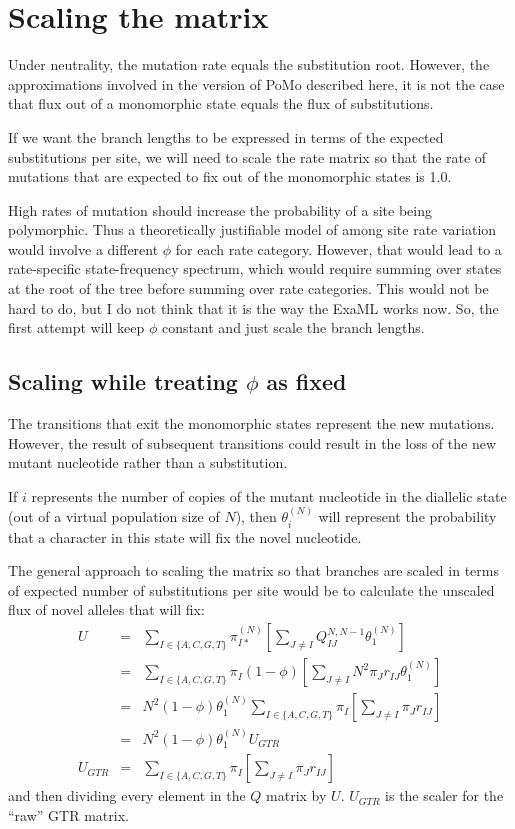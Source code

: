 \documentclass{llncs}
\newcommand{\polyProb}{\ensuremath{\phi}}
\newcommand{\pomo}{PoMo\xspace}
\begin{document}
\section{Scaling the matrix}
Under neutrality, the mutation rate equals the substitution root.
However, the approximations involved in the version of \pomo described here, 
    it is not the case that flux out of a monomorphic state equals the flux
    of substitutions.

If we want the branch lengths to be expressed in terms of the expected substitutions
    per site, we will need to scale the rate matrix so that the
    rate of mutations that are expected to fix out of the 
    monomorphic states is 1.0.

High rates of mutation should increase the probability of a site being polymorphic.
Thus a theoretically justifiable model of among site rate variation would involve
    a different $\polyProb$ for each rate category.
However, that would lead to a rate-specific state-frequency spectrum, which would
    require summing over states at the root of the tree before summing over rate 
    categories.
This would not be hard to do, but I do not think that it is the way the ExaML works now.
So, the first attempt will keep $\polyProb$ constant and just scale the branch lengths.

\subsection{Scaling while treating $\polyProb$ as fixed}
The transitions that exit the monomorphic states represent the new mutations.
However, the result of subsequent transitions could result in the loss of the 
    new mutant nucleotide rather than a substitution.


If $i$ represents the number of copies of the mutant nucleotide in the diallelic
state (out of a virtual population size of $N$), then $\theta_i^{(N)}$ will
represent the probability that a character in this 
state will fix the novel nucleotide.

The general approach to scaling the matrix so that branches are scaled in terms of
    expected number of substitutions per site would be to calculate the unscaled
    flux of novel alleles that will fix:
\begin{eqnarray}
 U & = & \sum_{I \in \{A,C,G,T\}}\pi_{I\ast}^{(N)}\left[\sum_{J\neq I}Q_{IJ}^{N,N-1}\theta_1^{(N)}\right] \nonumber \\
 & = & \sum_{I \in \{A,C,G,T\}} \pi_I(1-\polyProb)\left[\sum_{J\neq I}N^2\pi_J r_{IJ}\theta_1^{(N)}\right] \nonumber\\
 & = & N^2(1-\polyProb)\theta_1^{(N)}\sum_{I \in \{A,C,G,T\}} \pi_I\left[\sum_{J\neq I}\pi_J r_{IJ}\right] \nonumber\\
  & = & N^2(1-\polyProb)\theta_1^{(N)}U_{GTR} \\
  U_{GTR} & = &\sum_{I \in \{A,C,G,T\}} \pi_I\left[\sum_{J\neq I}\pi_J r_{IJ}\right]
\end{eqnarray}
and then dividing every element in the $Q$ matrix by $U$.
$U_{GTR}$ is the scaler for the ``raw'' GTR matrix.
\end{document}
